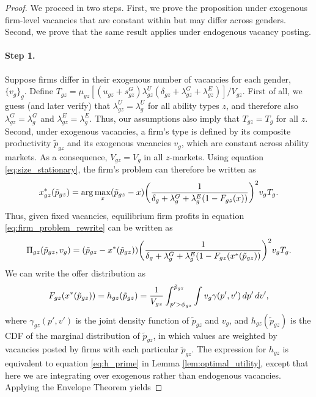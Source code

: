 %
\emph{%
}%
%
\begin{proof}
    We proceed in two steps. First, we prove the proposition under exogenous firm-level vacancies that are constant within but may differ across genders. Second, we prove that the same result applies under endogenous vacancy posting.


    \paragraph{Step 1.}

    Suppose firms differ in their exogenous number of vacancies for each gender, $\{ v_{g} \}_{g}$. Define $T_{gz} = \mu_{gz} [(u_{gz} + s_{gz}^{G}) \lambda_{gz}^{U} (\delta_{gz} + \lambda_{gz}^{G} + \lambda_{gz}^{E})] / V_{gz}$. First of all, we guess (and later verify) that  $\lambda_{gz}^{U} = \lambda_{g}^{U}$ for all ability types $z$, and therefore also $\lambda_{gz}^{G} = \lambda_{g}^{G}$ and $\lambda_{gz}^{E} = \lambda_{g}^{E}$. Thus, our assumptions also imply that $T_{gz} = T_{g}$ for all $z$. Second, under exogenous vacancies, a firm's type is defined by its composite productivity $\tilde{p}_{gz}$ and its exogenous vacancies $v_{g}$, which are constant across ability markets. As a consequence, $V_{gz} = V_{g}$ in all $z$-markets. Using equation \eqref{eq:size_stationary}, the firm's problem can therefore be written as
    \begin{align}
        x_{gz}^{*}(\tilde{p}_{gz}) = \arg \max_{x} (\tilde{p}_{gz} - x) \biggl{(} \frac{1}{\delta_{g} + \lambda_{g}^{G} + \lambda_{g}^{E} (1 - F_{gz}(x))} \biggr{)}^2 v_{g} T_{g}.
    \end{align}
    Thus, given fixed vacancies, equilibrium firm profits in equation \eqref{eq:firm_problem_rewrite} can be written as
    \begin{align}
        \Pi_{gz}(\tilde{p}_{gz},v_{g}) = (\tilde{p}_{gz} - x^{*}(\tilde{p}_{gz})) \biggl{(} \frac{1}{\delta_{g} + \lambda_{g}^{G} + \lambda_{g}^{E} (1 - F_{gz}(x^{*}(\tilde{p}_{gz}))} \biggr{)}^2 v_{g} T_{g}. \label{eq:profits_tildep}
    \end{align}
    We can write the offer distribution as
    \begin{align}
        F_{gz}(x^{*}(\tilde{p}_{gz})) = h_{gz}(\tilde{p}_{gz}) = \frac{1}{V_{gz}} \int_{p' > \phi_{gz}}^{\tilde{p}_{gz}} \int v_{g} \gamma(p',v') \mathop{}\!{d} p' \mathop{}\!{d} v' ,
    \end{align}
    where $\gamma_{gz}(p',v')$ is the joint density function of $\tilde{p}_{gz}$ and $v_{g}$, and $h_{gz}(\tilde{p}_{gz})$ is the CDF of the marginal distribution of $\tilde{p}_{gz}$, in which values are weighted by vacancies posted by firms with each particular $\tilde{p}_{gz}$. The expression for $h_{gz}$ is equivalent to equation \eqref{eq:h_prime} in Lemma \ref{lem:optimal_utility}, except that here we are integrating over exogenous rather than endogenous vacancies. Applying the Envelope Theorem yields

\end{proof}
